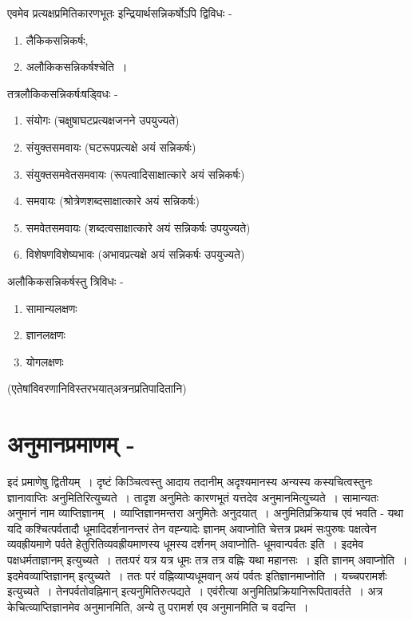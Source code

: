 {एवमेव प्रत्यक्षप्रमितिकारणभूतः इन्द्रियार्थसन्निकर्षोऽपि द्विविधः -
\begin{enumerate}
\item लैकिकसन्निकर्षः,
\item अलौकिकसन्निकर्षश्चेति~। 
\end{enumerate}
तत्रलौकिकसन्निकर्षःषड्विधः -
\begin{enumerate}
\item संयोगः (चक्षुषाघटप्रत्यक्षजनने उपयुज्यते)
\item	संयुक्तसमवायः (घटरूपप्रत्यक्षे अयं सन्निकर्षः)
\item	संयुक्तसमवेतसमवायः (रूपत्वादिसाक्षात्कारे अयं सन्निकर्षः)
\item 	समवायः (श्रोत्रेणशब्दसाक्षात्कारे अयं सन्निकर्षः)
\item 	समवेतसमवायः (शब्दत्वसाक्षात्कारे अयं सन्निकर्षः उपयुज्यते)
\item 	विशेषणविशेष्यभावः (अभावप्रत्यक्षे अयं सन्निकर्षः उपयुज्यते)
\end{enumerate}
अलौकिकसन्निकर्षस्तु त्रिविधः -
\begin{enumerate}
\item सामान्यलक्षणः
\item ज्ञानलक्षणः
\item योगलक्षणः
\end{enumerate}
(एतेषांविवरणानिविस्तरभयात्अत्रनप्रतिपादितानि)

\section*{अनुमानप्रमाणम् -}

इदं प्रमाणेषु द्वितीयम्~। दृष्टं किञ्चित्वस्तु आदाय तदानीम् अदृश्यमानस्य अन्यस्य कस्यचित्वस्तुनः ज्ञानावाप्तिः अनुमितिरित्युच्यते~। तादृश अनुमितेः कारणभूतं यत्तदेव अनुमानमित्युच्यते~। सामान्यतः अनुमानं नाम व्याप्तिज्ञानम्~। व्याप्तिज्ञानमन्तरा अनुमितेः अनुदयात्~। अनुमितिप्रक्रियाच एवं भवति - यथा यदि कश्चित्पर्वतादौ धूमादिदर्शनानन्तरं तेन वह्न्यादेः ज्ञानम् अवाप्नोति चेत्तत्र प्रथमं सःपुरुषः पक्षत्वेन व्यवह्रीयमाणे पर्वते हेतुरितिव्यवह्रीयमाणस्य धूमस्य दर्शनम् अवाप्नोति- धूमवान्पर्वतः इति~। इदमेव पक्षधर्मताज्ञानम् इत्युच्यते~। ततःपरं यत्र यत्र धूमः तत्र तत्र वह्निः यथा महानसः~। इति ज्ञानम् अवाप्नोति~। इदमेवव्याप्तिज्ञानम् इत्युच्यते~। ततः परं वह्निव्याप्यधूमवान् अयं पर्वतः इतिज्ञानमाप्नोति~। यच्चपरामर्शः इत्युच्यते~। तेनपर्वतोवह्निमान् इत्यनुमितिरुत्पद्यते~। एवंरीत्या अनुमितिप्रक्रियानिरूपितावर्तते~। अत्र केचित्व्याप्तिज्ञानमेव अनुमानमिति, अन्ये तु परामर्श एव अनुमानमिति च वदन्ति~। 

}
